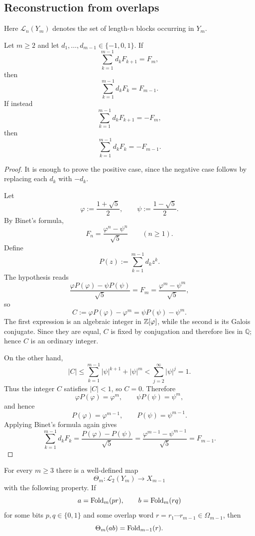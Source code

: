 \subsection{Reconstruction from overlaps}

Here $\mathcal L_n(Y_m)$ denotes the set of length-$n$ blocks occurring in
$Y_m$.

\begin{lemma}
\label{lem:signed-fibonacci-gap-shift}
Let $m\ge 2$ and let $d_1,\ldots,d_{m-1}\in\{-1,0,1\}$.  If
\[
\sum_{k=1}^{m-1} d_kF_{k+1}=F_m,
\]
then
\[
\sum_{k=1}^{m-1} d_kF_k=F_{m-1}.
\]
If instead
\[
\sum_{k=1}^{m-1} d_kF_{k+1}=-F_m,
\]
then
\[
\sum_{k=1}^{m-1} d_kF_k=-F_{m-1}.
\]
\end{lemma}

\begin{proof}
It is enough to prove the positive case, since the negative case follows by
replacing each $d_k$ with $-d_k$.

Let
\[
\varphi:=\frac{1+\sqrt5}{2},
\qquad
\psi:=\frac{1-\sqrt5}{2}.
\]
By Binet's formula,
\[
F_n=\frac{\varphi^n-\psi^n}{\sqrt5}
\qquad (n\ge 1).
\]
Define
\[
P(z):=\sum_{k=1}^{m-1} d_kz^k.
\]
The hypothesis reads
\[
\frac{\varphi P(\varphi)-\psi P(\psi)}{\sqrt5}=F_m
=
\frac{\varphi^m-\psi^m}{\sqrt5},
\]
so
\[
C:=\varphi P(\varphi)-\varphi^m
=
\psi P(\psi)-\psi^m.
\]
The first expression is an algebraic integer in $\mathbb{Z}[\varphi]$, while the
second is its Galois conjugate.  Since they are equal, $C$ is fixed by
conjugation and therefore lies in $\mathbb{Q}$; hence $C$ is an ordinary
integer.

On the other hand,
\[
|C|
\le
\sum_{k=1}^{m-1} |\psi|^{k+1}+|\psi|^m
<
\sum_{j=2}^{\infty} |\psi|^j
=
1.
\]
Thus the integer $C$ satisfies $|C|<1$, so $C=0$.  Therefore
\[
\varphi P(\varphi)=\varphi^m,
\qquad
\psi P(\psi)=\psi^m,
\]
and hence
\[
P(\varphi)=\varphi^{m-1},
\qquad
P(\psi)=\psi^{m-1}.
\]
Applying Binet's formula again gives
\[
\sum_{k=1}^{m-1} d_kF_k
=
\frac{P(\varphi)-P(\psi)}{\sqrt5}
=
\frac{\varphi^{m-1}-\psi^{m-1}}{\sqrt5}
=
F_{m-1}.
\]
\end{proof}

\begin{proposition}
\label{prop:pair-overlap-reduction}
For every $m\ge 3$ there is a well-defined map
\[
\Theta_m:\mathcal L_2(Y_m)\to X_{m-1}
\]
with the following property.  If
\[
a=\operatorname{Fold}_m(pr),
\qquad
b=\operatorname{Fold}_m(rq)
\]
for some bits $p,q\in\{0,1\}$ and some overlap word
$r=r_1\cdots r_{m-1}\in\Omega_{m-1}$, then
\[
\Theta_m(ab)=\operatorname{Fold}_{m-1}(r).
\]
\end{proposition}

